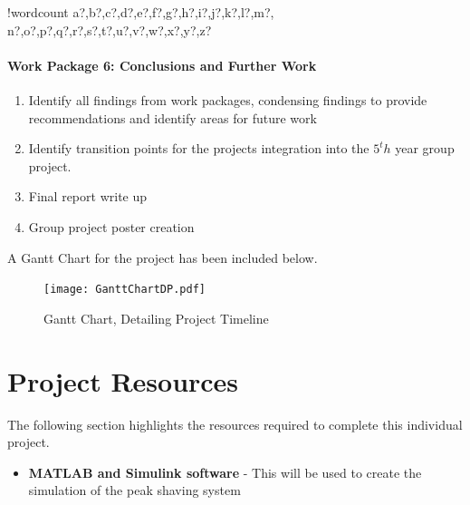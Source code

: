 \documentclass[10pt]{article}
\providecommand{\tightlist}{%
  \setlength{\itemsep}{0pt}\setlength{\parskip}{0pt}}
\let\oldparagraph\paragraph
\renewcommand{\paragraph}[1]{\oldparagraph{#1}\mbox{}}
\newcounter{words}
\newenvironment{counted}{%
  \setcounter{words}{0}
  \SearchList!{wordcount}{\stepcounter{words}}
    {a?,b?,c?,d?,e?,f?,g?,h?,i?,j?,k?,l?,m?,
    n?,o?,p?,q?,r?,s?,t?,u?,v?,w?,x?,y?,z?}
  \UndoBoundary{'}
  \SearchOrder{p;}}{%
  \StopSearching}
\begin{document}
\begin{counted}
\paragraph{Work Package 6: Conclusions and Further
Work}\label{work-package-6-conclusions-and-further-work}

\begin{enumerate}[label={6.\arabic*}]
\item Identify all findings from work packages, condensing findings to provide recommendations and identify areas for future work
\item Identify transition points for the projects integration into the $5^th$ year group project.
\item Final report write up
\item Group project poster creation
\end{enumerate}

A Gantt Chart for the project has been included below.

\newpage

\begin{landscape}

\begin{figure}[H]
\centering
\texttt{[image: GanttChartDP.pdf]}
\caption{Gantt Chart, Detailing Project Timeline}
\label{GanttChart}
\end{figure}

\end{landscape}

\newpage

\section{Project Resources}\label{project-resources}

The following section highlights the resources required to complete this
individual project.

\begin{itemize}
\tightlist
\item
  \textbf{MATLAB and Simulink software} - This will be used to create
  the simulation of the peak shaving system


\end{itemize}
\end{counted}
\end{document}
